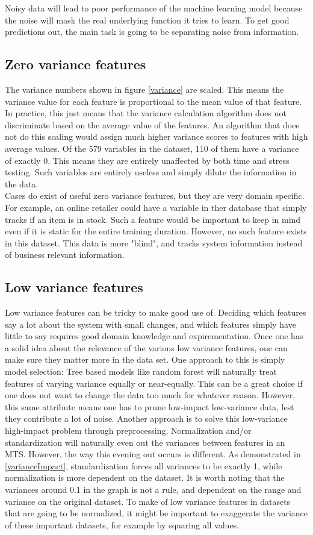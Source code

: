 Noisy data will lead to poor performance of the machine learning model because the noise will mask the real underlying function it tries to learn. To get good predictions out, the main task is going to be separating noise from information.

\subsection{Zero variance features}
The variance numbers shown in figure \ref*{variance} are scaled. This means the variance value for each feature is proportional to the mean value of that feature.
In practice, this just means that the variance calculation algorithm does not discriminate based on the average value of the features.
An algorithm that does not do this scaling would assign much higher variance scores to features with high average values.
Of the 579 variables in the dataset, 110 of them have a variance of exactly 0. This means they are entirely unaffected by both time and stress testing. Such variables are entirely useless and simply dilute the information in the data. \\
Cases do exist of useful zero variance features, but they are very domain specific.
For example, an online retailer could have a variable in ther database that simply tracks if an item is in stock. Such a feature would be important to keep in mind even if it is static for the entire training duration.
However, no such feature exists in this dataset. This data is more "blind", and tracks system information instead of business relevant information.

\subsection{Low variance features}
Low variance features can be tricky to make good use of. Deciding which features say a lot about the system with small changes, and which features simply have little to say requires good domain knowledge and expirementation.
Once one has a solid idea about the relevance of the various low variance features, one can make sure they matter more in the data set.
One approach to this is simply model selection: Tree based models like random forest will naturally treat features of varying variance equally or near-equally. This can be a great choice if one does not want to change the data too much for whatever reason. However, this same attribute means one has to prune low-impact low-variance data, lest they contribute a lot of noise.
Another approach is to solve this low-variance high-impact problem through preprocessing.
Normalization and/or standardization will naturally even out the variances between features in an MTS.
However, the way this evening out occurs is different. As demonstrated in \ref*{varianceImpact}, standardization forces all variances to be exactly 1, while normalization is more dependent on the dataset. It is worth noting that the variances around 0.1 in the graph is not a rule, and dependent on the range and variance on the original dataset.
To make of low variance features in datasets that are going to be normalized, it might be important to exaggerate the variance of these important datasets, for example by squaring all values.

